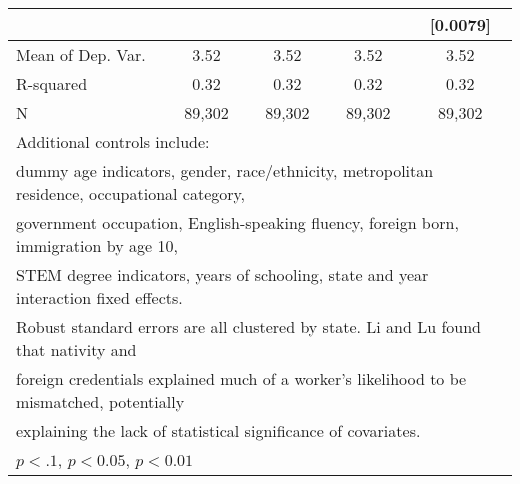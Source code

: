 \begin{table}[htbp]
\begin{tabular}{l*{4}{c}}
                    &                     &                     &                     &    [0.0079]         \\
\midrule
Mean of Dep. Var.   &        3.52         &        3.52         &        3.52         &        3.52         \\
R-squared           &        0.32         &        0.32         &        0.32         &        0.32         \\
N                   &      89,302         &      89,302         &      89,302         &      89,302         \\
\bottomrule
\multicolumn{5}{l}{\footnotesize Additional controls include:}\\
\multicolumn{5}{l}{\footnotesize dummy age indicators, gender, race/ethnicity, metropolitan residence, occupational category,}\\
\multicolumn{5}{l}{\footnotesize government occupation, English-speaking fluency, foreign born, immigration by age 10,}\\
\multicolumn{5}{l}{\footnotesize STEM degree indicators, years of schooling, state and year interaction fixed effects.}\\
\multicolumn{5}{l}{\footnotesize Robust standard errors are all clustered by state. Li and Lu found that nativity and}\\
\multicolumn{5}{l}{\footnotesize foreign credentials explained much of a worker's likelihood to be mismatched, potentially}\\
\multicolumn{5}{l}{\footnotesize explaining the lack of statistical significance of covariates.}\\
\multicolumn{5}{l}{\footnotesize \sym{*} \(p<.1\), \sym{**} \(p<0.05\), \sym{***} \(p<0.01\)}\\
\end{tabular}
\end{table}

